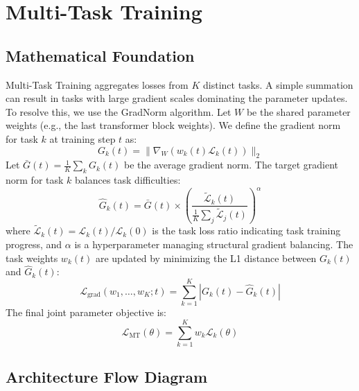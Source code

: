 \newpage
\section{Multi-Task Training}

\subsection{Mathematical Foundation}
Multi-Task Training aggregates losses from $K$ distinct tasks. A simple summation can result in tasks with large gradient scales dominating the parameter updates. To resolve this, we use the GradNorm algorithm. Let $W$ be the shared parameter weights (e.g., the last transformer block weights). We define the gradient norm for task $k$ at training step $t$ as:
\begin{equation}
  G_k(t) = \|\nabla_W (w_k(t) \mathcal{L}_k(t))\|_2
\end{equation}
Let $\bar{G}(t) = \frac{1}{K} \sum_k G_k(t)$ be the average gradient norm. The target gradient norm for task $k$ balances task difficulties:
\begin{equation}
  \hat{G}_k(t) = \bar{G}(t) \times \left( \frac{\tilde{\mathcal{L}}_k(t)}{\frac{1}{K}\sum_j \tilde{\mathcal{L}}_j(t)} \right)^\alpha
\end{equation}
where $\tilde{\mathcal{L}}_k(t) = \mathcal{L}_k(t) / \mathcal{L}_k(0)$ is the task loss ratio indicating task training progress, and $\alpha$ is a hyperparameter managing structural gradient balancing. The task weights $w_k(t)$ are updated by minimizing the L1 distance between $G_k(t)$ and $\hat{G}_k(t)$:
\begin{equation}
  \mathcal{L}_{\text{grad}}(w_1, \dots, w_K; t) = \sum_{k=1}^K \left| G_k(t) - \hat{G}_k(t) \right|
\end{equation}
The final joint parameter objective is:
\begin{equation}
  \mathcal{L}_{\text{MT}}(\theta) = \sum_{k=1}^K w_k \mathcal{L}_k(\theta)
\end{equation}

\subsection{Architecture Flow Diagram}

